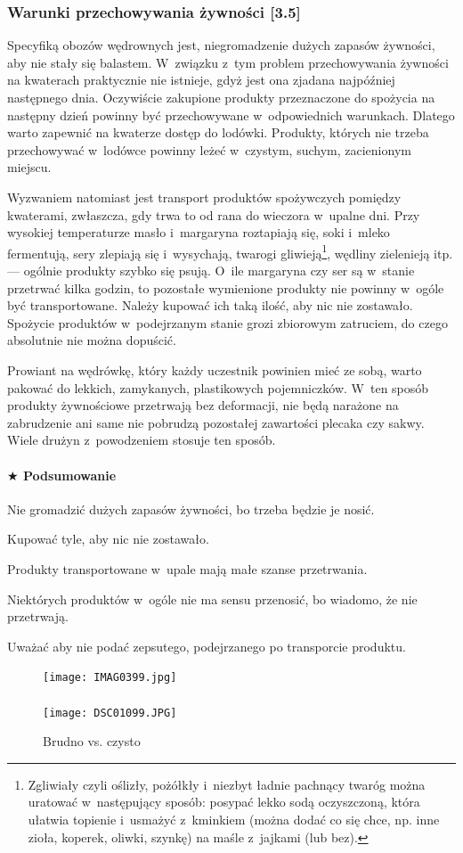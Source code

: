 \documentclass[a5paper,10pt,titlepage,twoside]{article}
\newcommand*{\thecheckbox}{\hss$\Box$} %
\newenvironment*{checklist}
{\list{}{%
\renewcommand*{\makelabel}[1]{\thecheckbox}}}
{\endlist}
\begin{document}
\subsubsection{Warunki przechowywania żywności [3.5]}
Specyfiką obozów wędrownych jest, niegromadzenie dużych zapasów żywności, aby nie stały się balastem. W~związku z~tym problem przechowywania żywności na kwaterach praktycznie nie istnieje, gdyż jest ona zjadana najpóźniej następnego dnia. Oczywiście zakupione produkty przeznaczone do spożycia na następny dzień powinny być przechowywane w~odpowiednich warunkach. Dlatego warto zapewnić na kwaterze dostęp do lodówki. Produkty, których nie trzeba przechowywać w~lodówce powinny leżeć w~czystym, suchym, zacienionym miejscu.

Wyzwaniem natomiast jest transport produktów spożywczych pomiędzy kwaterami, zwłaszcza, gdy trwa to od rana do wieczora w~upalne dni. Przy wysokiej temperaturze masło i~margaryna roztapiają się, soki i~mleko fermentują, sery zlepiają się i~wysychają, twarogi gliwieją\footnote{Zgliwiały czyli oślizły, pożółkły i~niezbyt ładnie pachnący twaróg można uratować w~następujący sposób: posypać lekko sodą oczyszczoną, która ułatwia topienie i~usmażyć z~kminkiem (można dodać co się chce, np. inne zioła, koperek, oliwki, szynkę) na maśle z~jajkami (lub bez).}, wędliny zielenieją itp. --- ogólnie produkty szybko się psują. O~ile margaryna czy ser są w~stanie przetrwać kilka godzin, to pozostałe wymienione produkty nie powinny w~ogóle być transportowane. Należy kupować ich taką ilość, aby nic nie zostawało. Spożycie produktów w~podejrzanym stanie grozi zbiorowym zatruciem, do czego absolutnie nie można dopuścić.

Prowiant na wędrówkę, który każdy uczestnik powinien mieć ze sobą, warto pakować do lekkich, zamykanych, plastikowych pojemniczków. W~ten sposób produkty żywnościowe przetrwają bez deformacji, nie będą narażone na zabrudzenie ani same nie pobrudzą pozostałej zawartości plecaka czy sakwy. Wiele drużyn z~powodzeniem stosuje ten sposób.
\paragraph{$\bigstar$ Podsumowanie}
\begin{checklist}
\item Nie gromadzić dużych zapasów żywności, bo trzeba będzie je nosić.
\item Kupować tyle, aby nic nie zostawało.
\item Produkty transportowane w~upale mają małe szanse przetrwania.
\item Niektórych produktów w~ogóle nie ma sensu przenosić, bo wiadomo, że nie przetrwają.
\item Uważać aby nie podać zepsutego, podejrzanego po transporcie produktu.
\end{checklist}
\begin{figure}[htp]
\centering
\texttt{[image: IMAG0399.jpg]}\\
~~~~~~~~\\
\texttt{[image: DSC01099.JPG]}
\caption{Brudno vs. czysto}\label{fig:brudny-stol}
\end{figure}
\end{document}
